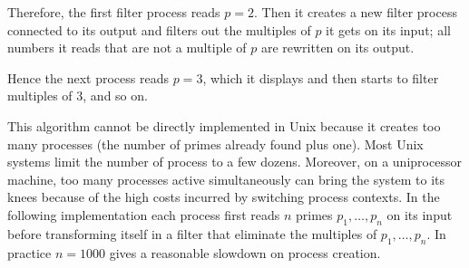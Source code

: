 \begin{myimage}[width="38\%"]
\end{myimage}
%
Therefore, the first filter process reads $p=2$. Then it creates a new
filter process connected to its output and filters out the multiples
of $p$ it gets on its input; all numbers it reads that are not a
multiple of $p$ are rewritten on its output.
%
\begin{myimage}[width="65\%"]
\end{myimage}
%
Hence the next process reads $p=3$, which it displays and then starts
to filter multiples of 3, and so on.
%
\begin{myimage}[width="100\%"]
\end{myimage}
% 
This algorithm cannot be directly implemented in Unix because it
creates too many processes (the number of primes already found plus
one). Most Unix systems limit the number of process to a few dozens.
Moreover, on a uniprocessor machine, too many processes active
simultaneously can bring the system to its knees because of the
high costs incurred by switching process contexts. In the following
implementation each process first reads $n$ primes $p_1, \ldots, p_n$
on its input before transforming itself in a filter that eliminate the
multiples of $p_1, \ldots, p_n$. In practice $n = 1000$ gives a
reasonable slowdown on process creation.

